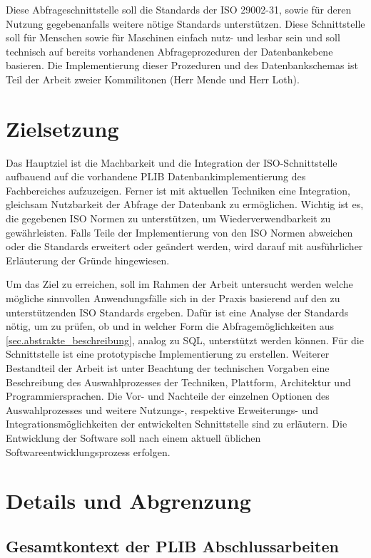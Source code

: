 Diese Abfrageschnittstelle soll die Standards der ISO 29002-31, sowie für deren Nutzung gegebenanfalls weitere nötige Standards unterstützen. Diese Schnittstelle soll für Menschen sowie für Maschinen einfach nutz- und lesbar sein und soll technisch auf bereits vorhandenen Abfrageprozeduren der Datenbankebene basieren. Die Implementierung dieser Prozeduren und des Datenbankschemas ist Teil der Arbeit zweier Kommilitonen (Herr Mende und Herr Loth).

\section{Zielsetzung}

Das Hauptziel ist die Machbarkeit und die Integration der ISO-Schnittstelle aufbauend auf die vorhandene PLIB Datenbankimplementierung des Fachbereiches aufzuzeigen. 
Ferner ist mit aktuellen Techniken eine Integration, gleichsam Nutzbarkeit der Abfrage der Datenbank zu ermöglichen. Wichtig ist es, die gegebenen ISO Normen zu unterstützen, um Wiederverwendbarkeit zu gewährleisten. Falls Teile der Implementierung von den ISO Normen abweichen oder die Standards erweitert oder geändert werden, wird darauf mit ausführlicher Erläuterung der Gründe hingewiesen. 

Um das Ziel zu erreichen, soll im Rahmen der Arbeit untersucht werden welche mögliche sinnvollen Anwendungsfälle sich in der Praxis basierend auf den zu unterstützenden ISO Standards ergeben. Dafür ist eine Analyse der Standards nötig, um zu prüfen, ob und in welcher Form die Abfragemöglichkeiten aus \autoref{sec.abstrakte_beschreibung}, analog zu SQL, unterstützt werden können. Für die Schnittstelle ist eine prototypische Implementierung zu erstellen. Weiterer Bestandteil der Arbeit ist unter Beachtung der technischen Vorgaben eine Beschreibung des Auswahlprozesses der Techniken, Plattform, Architektur und Programmiersprachen. Die Vor- und Nachteile der einzelnen Optionen des Auswahlprozesses und weitere Nutzungs-, respektive Erweiterungs- und Integrationsmöglichkeiten der entwickelten Schnittstelle sind zu erläutern. 
Die Entwicklung der Software soll nach einem aktuell üblichen Softwareentwicklungsprozess erfolgen. 

\section{Details und Abgrenzung}

\subsection{Gesamtkontext der PLIB Abschlussarbeiten}

